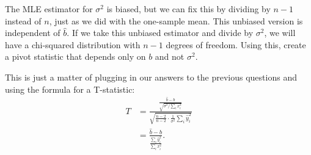 
The MLE estimator for $\sigma^2$ is biased, but we can fix this by dividing by
$n-1$ instead of $n$, just as we did with the one-sample mean. This unbiased
version is independent of $\widehat{b}$. If we take this unbiased estimator and
divide by $\sigma^2$, we will have a chi-squared distribution with $n-1$ degrees
of freedom. Using this, create a pivot statistic that depends only on $b$ and not
$\sigma^2$.


This is just a matter of plugging in our answers to the previous questions and
using the formula for a T-statistic:
\begin{align*}
T &= \frac{\frac{\widehat{b} - b}{\sqrt{\sigma^2 / \sum_i x_i^2}}}{
  \sqrt{ \frac{n-2}{n-2} \cdot \frac{1}{\sigma^2} \sum_i \widehat{y}_i^2 }
} \\
&=
\frac{\widehat{b} - b}{\frac{\sum_i \widehat{y}_i^2}{\sum_i x_i^2}}.
\end{align*}




